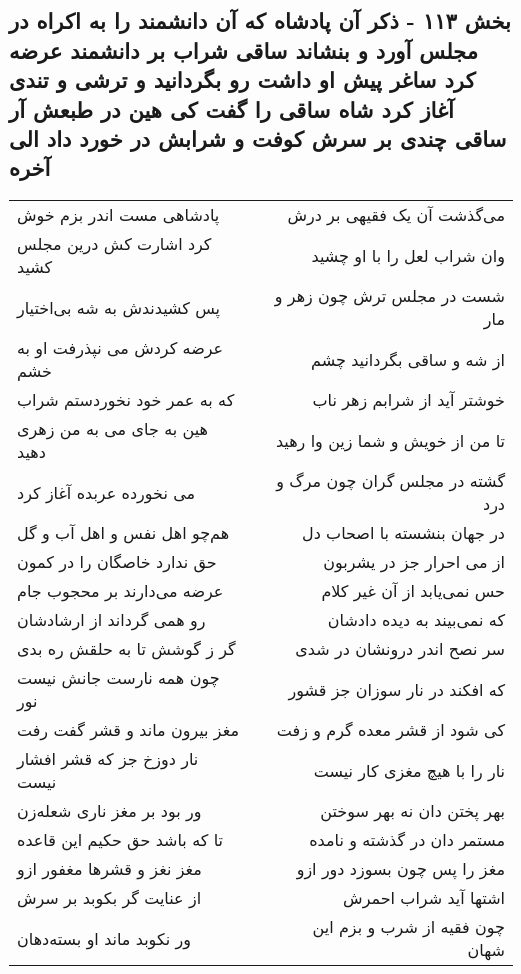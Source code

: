 \begin{center}
\section*{بخش ۱۱۳ - ذکر آن پادشاه که آن دانشمند را به اکراه در مجلس آورد و بنشاند ساقی شراب بر دانشمند عرضه کرد ساغر پیش او داشت رو بگردانید و ترشی و تندی آغاز کرد شاه ساقی را گفت کی هین در طبعش آر ساقی چندی بر سرش کوفت و شرابش در خورد داد الی آخره}
\label{sec:sh113}
\begin{longtable}{l p{0.5cm} r}
پادشاهی مست اندر بزم خوش
&&
می‌گذشت آن یک فقیهی بر درش
\\
کرد اشارت کش درین مجلس کشید
&&
وان شراب لعل را با او چشید
\\
پس کشیدندش به شه بی‌اختیار
&&
شست در مجلس ترش چون زهر و مار
\\
عرضه کردش می نپذرفت او به خشم
&&
از شه و ساقی بگردانید چشم
\\
که به عمر خود نخوردستم شراب
&&
خوشتر آید از شرابم زهر ناب
\\
هین به جای می به من زهری دهید
&&
تا من از خویش و شما زین وا رهید
\\
می نخورده عربده آغاز کرد
&&
گشته در مجلس گران چون مرگ و درد
\\
هم‌چو اهل نفس و اهل آب و گل
&&
در جهان بنشسته با اصحاب دل
\\
حق ندارد خاصگان را در کمون
&&
از می احرار جز در یشربون
\\
عرضه می‌دارند بر محجوب جام
&&
حس نمی‌یابد از آن غیر کلام
\\
رو همی گرداند از ارشادشان
&&
که نمی‌بیند به دیده دادشان
\\
گر ز گوشش تا به حلقش ره بدی
&&
سر نصح اندر درونشان در شدی
\\
چون همه نارست جانش نیست نور
&&
که افکند در نار سوزان جز قشور
\\
مغز بیرون ماند و قشر گفت رفت
&&
کی شود از قشر معده گرم و زفت
\\
نار دوزخ جز که قشر افشار نیست
&&
نار را با هیچ مغزی کار نیست
\\
ور بود بر مغز ناری شعله‌زن
&&
بهر پختن دان نه بهر سوختن
\\
تا که باشد حق حکیم این قاعده
&&
مستمر دان در گذشته و نامده
\\
مغز نغز و قشرها مغفور ازو
&&
مغز را پس چون بسوزد دور ازو
\\
از عنایت گر بکوبد بر سرش
&&
اشتها آید شراب احمرش
\\
ور نکوبد ماند او بسته‌دهان
&&
چون فقیه از شرب و بزم این شهان
\\

\end{longtable}
\end{center}
